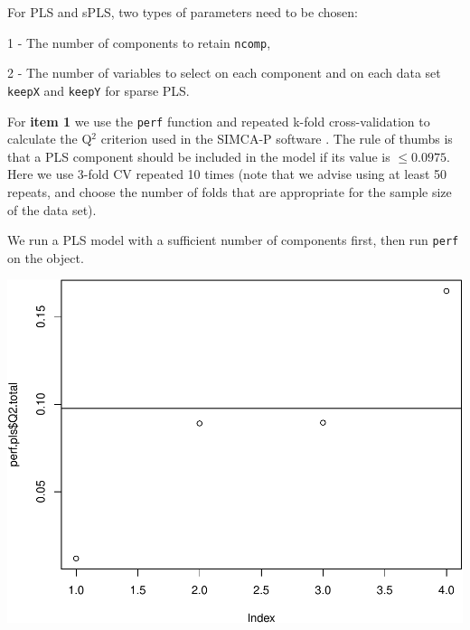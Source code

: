 \documentclass[]{book}
\newenvironment{Shaded}{\begin{snugshade}}{\end{snugshade}}
\newcommand{\CommentTok}[1]{\textcolor[rgb]{0.56,0.35,0.01}{\textit{#1}}}
\newcommand{\DataTypeTok}[1]{\textcolor[rgb]{0.13,0.29,0.53}{#1}}
\newcommand{\DecValTok}[1]{\textcolor[rgb]{0.00,0.00,0.81}{#1}}
\newcommand{\FloatTok}[1]{\textcolor[rgb]{0.00,0.00,0.81}{#1}}
\newcommand{\KeywordTok}[1]{\textcolor[rgb]{0.13,0.29,0.53}{\textbf{#1}}}
\newcommand{\NormalTok}[1]{#1}
\newcommand{\OperatorTok}[1]{\textcolor[rgb]{0.81,0.36,0.00}{\textbf{#1}}}
\newcommand{\OtherTok}[1]{\textcolor[rgb]{0.56,0.35,0.01}{#1}}
\newcommand{\StringTok}[1]{\textcolor[rgb]{0.31,0.60,0.02}{#1}}
\begin{document}
For PLS and sPLS, two types of parameters need to be chosen:

1 - The number of components to retain \texttt{ncomp},

2 - The number of variables to select on each component and on each data set \texttt{keepX} and \texttt{keepY} for sparse PLS.

For \textbf{item 1} we use the \texttt{perf} function and repeated k-fold cross-validation to calculate the Q\(^2\) criterion used in the SIMCA-P software \citep{Ume96}. The rule of thumbs is that a PLS component should be included in the model if its value is \(\leq 0.0975\). Here we use 3-fold CV repeated 10 times (note that we advise using at least 50 repeats, and choose the number of folds that are appropriate for the sample size of the data set).

We run a PLS model with a sufficient number of components first, then run \texttt{perf} on the object.

\begin{Shaded}
\end{Shaded}

\begin{center}\includegraphics[width=0.5\linewidth,]{Figures/05-pls-perf-1} \end{center}
\end{document}
